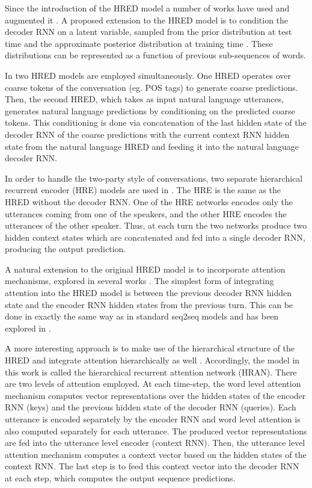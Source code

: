 \documentclass[12pt]{article}
\begin{document}
Since the introduction of the HRED model a number of works have used and augmented it \cite{Serban_VHRED:2017,Serban_MrRNN:2017,Serban:2017,Shen:2017,Li_adversarial:2017}. A proposed extension to the HRED model is to condition the decoder RNN on a latent variable, sampled from the prior distribution at test time and the approximate posterior distribution at training time \cite{Serban_VHRED:2017}. These distributions can be represented as a function of previous sub-sequences of words. 

In \cite{Serban_MrRNN:2017} two HRED models are employed simultaneously. One HRED operates over coarse tokens of the conversation (eg. POS tags) to generate coarse predictions. Then, the second HRED, which takes as input natural language utterances, generates natural language predictions by conditioning on the predicted coarse tokens. This conditioning is done via concatenation of the last hidden state of the decoder RNN of the coarse predictions with the current context RNN hidden state from the natural language HRED and feeding it into the natural language decoder RNN.

In order to handle the two-party style of conversations, two separate hierarchical recurrent encoder (HRE) models are used in \cite{Shen:2017}. The HRE is the same as the HRED without the decoder RNN. One of the HRE networks encodes only the utterances coming from one of the speakers, and the other HRE encodes the utterances of the other speaker. Thus, at each turn the two networks produce two hidden context states which are concatenated and fed into a single decoder RNN, producing the output prediction.

A natural extension to the original HRED model is to incorporate attention mechanisms, explored in several works \cite{Yao:2015,Yao:2016,Xing:2017}. The simplest form of integrating attention into the HRED model is between the previous decoder RNN hidden state and the encoder RNN hidden states from the previous turn. This can be done in exactly the same way as in standard seq2seq models and has been explored in \cite{Yao:2015,Yao:2016}.

A more interesting approach is to make use of the hierarchical structure of the HRED and integrate attention hierarchically as well \cite{Xing:2017}. Accordingly, the model in this work is called the hierarchical recurrent attention network (HRAN). There are two levels of attention employed. At each time-step, the word level attention mechanism computes vector representations over the hidden states of the encoder RNN (keys) and the previous hidden state of the decoder RNN (queries). Each utterance is encoded separately by the encoder RNN and word level attention is also computed separately for each utterance. The produced vector representations are fed into the utterance level encoder (context RNN). Then, the utterance level attention mechanism computes a context vector based on the hidden states of the context RNN. The last step is to feed this context vector into the decoder RNN at each step, which computes the output sequence predictions. 
\end{document}
